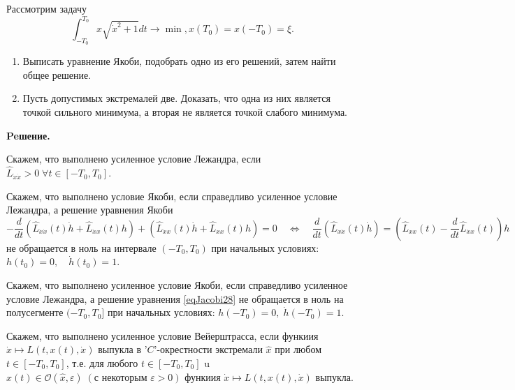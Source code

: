 \begin{task}
    Рассмотрим задачу
    \begin{equation*}
        \int_{-T_0}^{T_0} x \sqrt{\dot{x}^2+1} d t \rightarrow \min , 
        x\left(T_0\right) = x \left( -T_0 \right) = \xi.
    \end{equation*}
    \begin{enumerate}
        \item Выписать уравнение Якоби, подобрать одно из его решений, 
        затем найти общее решение. 
        \item Пусть допустимых экстремалей две. Доказать, что одна из них 
        является точкой сильного минимума, а вторая не является точкой слабого минимума.
    \end{enumerate}


    \textbf{Peшение.} 
    \begin{definition}
        Скажем, что выполнено усиленное условие Лежандра, 
        если $\widehat L_{\dot{x}\dot{x}} > 0 \; \forall t \in [-T_0, T_0]$.
    \end{definition}

    \begin{definition} Скажем, что выполнено условие Якоби, 
        если справедливо усиленное условие Лежандра, а решение уравнения Якоби
        \begin{equation} \label{eqJacobi28} 
            -\frac{d}{d t}\left(\widehat{L}_{\dot{x} \dot{x}}(t) \dot{h}
                +\widehat{L}_{\dot{x} x}(t) h\right)
                +\left(\widehat{L}_{\dot{x} x}(t) \dot{h}
                +\widehat{L}_{x x}(t) h\right)=0 \quad 
                \Leftrightarrow \quad \frac{d}{d t}\left(\widehat{L}_{\dot{x} \dot{x}}(t) \dot{h}\right)
                =\left(\widehat{L}_{x x}(t)-\frac{d}{d t} \widehat{L}_{\dot{x} x}(t)\right) h
        \end{equation}
        не обращается в ноль на интервале $\left(-T_0, T_0\right)$ при начальных условиях: 
        $h\left(t_0\right)=0, \quad \dot{h}\left(t_0\right)=1$. 
    \end{definition}
    \begin{definition}
        Скажем, что выполнено усиленное условие Якоби, если справедливо усиленное условие 
        Лежандра, а решение уравнения \eqref{eqJacobi28} не обращается в ноль на полусегменте
        $(-T_0, T_0]$ при начальных условиях: ${h(-T_0)=0, \; \dot{h}(-T_0)=1}$.
    \end{definition}

    \begin{definition}
        Скажем, что выполнено усиленное условие Вейерштрасса, 
        если функиия $\dot{x} \mapsto L(t, x(t), \dot{x})$ 
        выпукла в '$C$'-окрестности экстремали $\widehat{x}$ 
        при любом $t \in\left[-T_0, T_0\right]$, т.е. для любого 
        $t \in\left[-T_0, T_0\right]$ u $x(t) \in 
        \mathcal{O}(\widehat{x}, \varepsilon) \;
        (\text {с некоторым } {\varepsilon>0})$ функиия
        $\dot{x} \mapsto L(t, x(t), \dot{x})$ выпукла.
    \end{definition}


\end{task}
